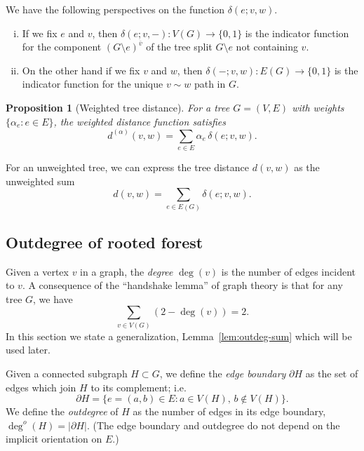 \documentclass{amsart}
\newtheorem{prop}[thm]{Proposition}
\theoremstyle{definition}
\newcommand{\degout}{\deg^o}
\begin{document}
We have the following perspectives on the function $\delta(e; v,w)$.
\begin{enumerate}[(i)]
\item 
If we fix $e$ and $v$,
then $\delta(e;v, -) : V(G) \to \{0,1\}$ 
is the indicator function for the component 
$(G \setminus e)^{\overline v}$ of the tree split $G \setminus e$
not containing $v$.

\item 
On the other hand if we fix $v$ and $w$, then $\delta(-;v,w) : E(G) \to \{0,1\}$
is the indicator function for the unique $v \sim w$ path in $G$.

\end{enumerate}


\begin{prop}[Weighted tree distance]
\label{prop:distance-sum}
For a tree $G = (V,E)$ with weights $\{\alpha_e : e \in E\}$,
the weighted distance function satisfies
\[ 
d^{(\alpha)}(v,w) = \sum_{e \in E} \alpha_e \, \delta(e; v,w) .
\]
\end{prop}

For an unweighted tree, we can express the tree distance $d(v,w)$ as the unweighted sum
\begin{equation*}
	d(v,w) = \sum_{e \in E(G)} \delta(e; v,w).
\end{equation*}


\subsection{Outdegree of rooted forest}
\label{sec:outdegree}

Given a vertex $v$ in a graph, the {\em degree} $\deg(v)$ is the number of edges incident to $v$.
A consequence of the ``handshake lemma'' of graph theory is that for any tree $G$, we have
\[
	\sum_{v \in V(G)} (2 - \deg(v)) = 2.
\]
In this section we state a generalization, Lemma~\ref{lem:outdeg-sum} which will be used later.

Given a connected subgraph $H \subset G$,
we define the {\em edge boundary}  $\partial H$ as the set of edges which join $H$ to its complement; i.e.
\begin{equation}
	\partial H = \{ e = (a,b) \in E : a \in V(H),\, b \not\in V(H)\}.
\end{equation}
We define the {\em outdegree} of $H$ as the number of edges in its edge boundary, $\degout(H) = |\partial H|$. 
(The edge boundary and outdegree do not depend on the implicit orientation on $E$.)
\end{document}

